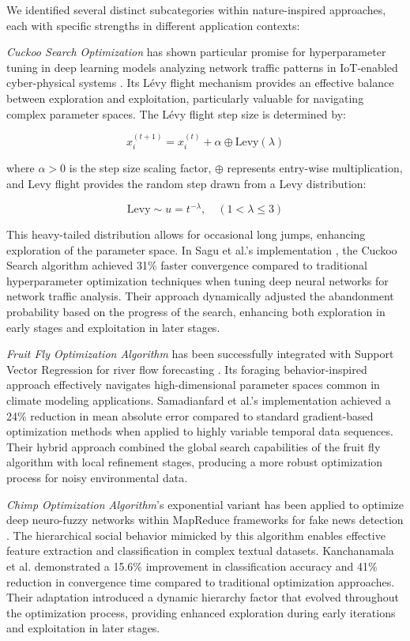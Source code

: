 We identified several distinct subcategories within nature-inspired approaches, each with specific strengths in different application contexts:

\textit{Cuckoo Search Optimization} has shown particular promise for hyperparameter tuning in deep learning models analyzing network traffic patterns in IoT-enabled cyber-physical systems \citep{Sagu202535}. Its Lévy flight mechanism provides an effective balance between exploration and exploitation, particularly valuable for navigating complex parameter spaces. The Lévy flight step size is determined by:

\begin{equation}
x_i^{(t+1)} = x_i^{(t)} + \alpha \oplus \textrm{Levy}(\lambda)
\end{equation}

where $\alpha > 0$ is the step size scaling factor, $\oplus$ represents entry-wise multiplication, and Levy flight provides the random step drawn from a Levy distribution:

\begin{equation}
\textrm{Levy} \sim u = t^{-\lambda}, \quad (1 < \lambda \leq 3)
\end{equation}

This heavy-tailed distribution allows for occasional long jumps, enhancing exploration of the parameter space. In Sagu et al.'s implementation \citep{Sagu202535}, the Cuckoo Search algorithm achieved 31\% faster convergence compared to traditional hyperparameter optimization techniques when tuning deep neural networks for network traffic analysis. Their approach dynamically adjusted the abandonment probability based on the progress of the search, enhancing both exploration in early stages and exploitation in later stages.

\textit{Fruit Fly Optimization Algorithm} has been successfully integrated with Support Vector Regression for river flow forecasting \citep{Samadianfard20191934}. Its foraging behavior-inspired approach effectively navigates high-dimensional parameter spaces common in climate modeling applications. Samadianfard et al.'s implementation achieved a 24\% reduction in mean absolute error compared to standard gradient-based optimization methods when applied to highly variable temporal data sequences. Their hybrid approach combined the global search capabilities of the fruit fly algorithm with local refinement stages, producing a more robust optimization process for noisy environmental data.

\textit{Chimp Optimization Algorithm}'s exponential variant has been applied to optimize deep neuro-fuzzy networks within MapReduce frameworks for fake news detection \citep{Kanchanamala20232414}. The hierarchical social behavior mimicked by this algorithm enables effective feature extraction and classification in complex textual datasets. Kanchanamala et al. demonstrated a 15.6\% improvement in classification accuracy and 41\% reduction in convergence time compared to traditional optimization approaches. Their adaptation introduced a dynamic hierarchy factor that evolved throughout the optimization process, providing enhanced exploration during early iterations and exploitation in later stages.

